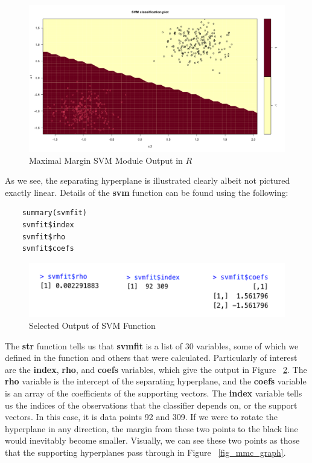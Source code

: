 \documentclass[12pt]{article}
\begin{document}
\begin{figure}
    \centering
    \includegraphics[width=5.5in]{Figures/mmc_module_output.png}
    \caption{Maximal Margin SVM Module Output in $R$}
    \label{fig_mmc_module_output}
\end{figure}
As we see, the separating hyperplane is illustrated clearly albeit not pictured exactly linear. Details of the \textbf{svm} function can be found using the following:
\begin{verbatim}
    summary(svmfit)
    svmfit$index
    svmfit$rho
    svmfit$coefs
\end{verbatim}

\begin{figure}[ht]
    \centering
    \includegraphics[width=5in]{Figures/mmc_selected_output.png}
    \caption{Selected Output of SVM Function}
    \label{fig_mmc_selected_output}
\end{figure}

The \textbf{str} function tells us that \textbf{svmfit} is a list of 30 variables, some of which we defined in the function and others that were calculated. Particularly of interest are the \textbf{index}, \textbf{rho}, and \textbf{coefs} variables, which give the output in Figure ~\ref{fig_mmc_selected_output}. The \textbf{rho} variable is the intercept of the separating hyperplane, and the \textbf{coefs} variable is an array of the coefficients of the supporting vectors. The \textbf{index} variable tells us the indices of the observations that the classifier depends on, or the support vectors. In this case, it is data points 92 and 309. If we were to rotate the hyperplane in any direction, the margin from these two points to the black line would inevitably become smaller. Visually, we can see these two points as those that the supporting hyperplanes pass through in Figure ~\ref{fig_mmc_graph}.
\end{document}
